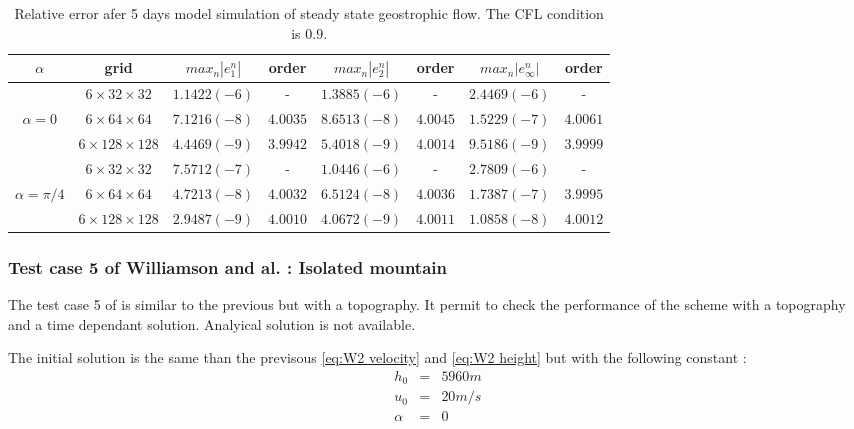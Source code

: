 \begin{table}[ht!]
\begin{tabular}{|c|c||cc|cc|cc|}
\hline
$\alpha$ & grid & $max_n |e_1^n |$ & order & $max_n |e_2^n |$ & order &  $max_n |e_{\infty}^n |$ & order \\
\hline
\hline
              & $6 \times 32 \times 32$   & $1.1422 (-6)$ & - & $1.3885 (-6)$ & - & $2.4469 (-6)$ & - \\
$\alpha = 0$  & $6 \times 64 \times 64$   & $7.1216 (-8)$ & $4.0035$ & $8.6513 (-8)$ & $4.0045$ & $1.5229 (-7)$ & $4.0061$ \\
              & $6 \times 128 \times 128$ & $4.4469 (-9)$ & $3.9942$ & $5.4018 (-9)$ & $4.0014$ & $9.5186 (-9)$ & $3.9999$ \\
\hline
\hline
                & $6 \times 32 \times 32$   & $7.5712 (-7)$ & - & $1.0446 (-6)$ & - & $2.7809 (-6)$ & - \\
$\alpha = \pi/4$& $6 \times 64 \times 64$   & $4.7213 (-8)$ & $4.0032$ & $6.5124 (-8)$ & $4.0036$ & $1.7387 (-7)$ & $3.9995$ \\
                & $6 \times 128 \times 128$ & $2.9487 (-9)$ & $4.0010$ & $4.0672 (-9)$ & $4.0011$ & $1.0858 (-8)$ & $4.0012$ \\
\hline
\end{tabular}
\caption{Relative error afer 5 days model simulation of steady state geostrophic flow. The CFL condition is $0.9$.}
\label{tab:W2 error order}
\end{table}

\subsubsection{Test case 5 of Williamson and al. : Isolated mountain}

The test case 5 of \cite{Williamson-Drake-Hack-Jakob-Swarztrauber} is similar to the previous but with a topography. It permit to check the performance of the scheme with a topography and a time dependant solution.
Analyical solution is not available.

The initial solution is the same than the previsous \eqref{eq:W2 velocity} and \eqref{eq:W2 height} but with the following constant :
\begin{equation}
\begin{array}{rcl}
h_0 & = & 5960m \\
u_0 & = & 20 m/s \\
\alpha & = & 0 \\
\end{array}
\end{equation}

